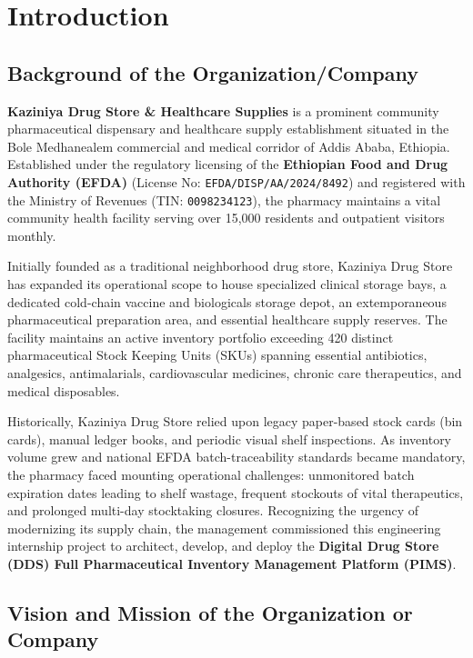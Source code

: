 \chapter{Introduction}
\label{chap:introduction}

\section{Background of the Organization/Company}
\textbf{Kaziniya Drug Store \& Healthcare Supplies} is a prominent community pharmaceutical dispensary and healthcare supply establishment situated in the Bole Medhanealem commercial and medical corridor of Addis Ababa, Ethiopia. Established under the regulatory licensing of the \textbf{Ethiopian Food and Drug Authority (EFDA)} (License No: \texttt{EFDA/DISP/AA/2024/8492}) and registered with the Ministry of Revenues (TIN: \texttt{0098234123}), the pharmacy maintains a vital community health facility serving over 15,000 residents and outpatient visitors monthly.

Initially founded as a traditional neighborhood drug store, Kaziniya Drug Store has expanded its operational scope to house specialized clinical storage bays, a dedicated cold-chain vaccine and biologicals storage depot, an extemporaneous pharmaceutical preparation area, and essential healthcare supply reserves. The facility maintains an active inventory portfolio exceeding 420 distinct pharmaceutical Stock Keeping Units (SKUs) spanning essential antibiotics, analgesics, antimalarials, cardiovascular medicines, chronic care therapeutics, and medical disposables.

Historically, Kaziniya Drug Store relied upon legacy paper-based stock cards (bin cards), manual ledger books, and periodic visual shelf inspections. As inventory volume grew and national EFDA batch-traceability standards became mandatory, the pharmacy faced mounting operational challenges: unmonitored batch expiration dates leading to shelf wastage, frequent stockouts of vital therapeutics, and prolonged multi-day stocktaking closures. Recognizing the urgency of modernizing its supply chain, the management commissioned this engineering internship project to architect, develop, and deploy the \textbf{Digital Drug Store (DDS) Full Pharmaceutical Inventory Management Platform (PIMS)}.

\section{Vision and Mission of the Organization or Company}

